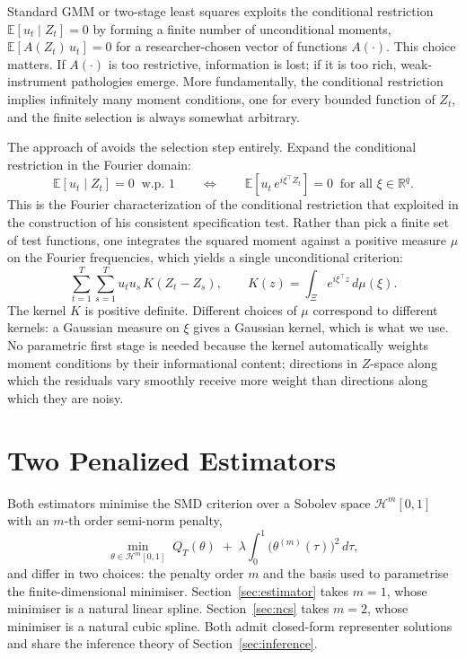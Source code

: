 \documentclass[12pt]{article}
\newcommand{\R}{\mathbb{R}}
\newcommand{\E}{\mathbb{E}}
\newcommand{\calH}{\mathcal{H}}
\begin{document}
Standard GMM or two-stage least squares exploits the conditional restriction $\E[u_t \mid Z_t] = 0$ by forming a finite number of unconditional moments, $\E[A(Z_t)\, u_t] = 0$ for a researcher-chosen vector of functions $A(\cdot)$. This choice matters. If $A(\cdot)$ is too restrictive, information is lost; if it is too rich, weak-instrument pathologies emerge. More fundamentally, the conditional restriction implies infinitely many moment conditions, one for every bounded function of $Z_t$, and the finite selection is always somewhat arbitrary.

The approach of \citet{AntoineSun2024} avoids the selection step entirely. Expand the conditional restriction in the Fourier domain:
\[
  \E[u_t \mid Z_t] = 0 \;\; \text{w.p.\ 1}
  \qquad\Longleftrightarrow\qquad
  \E\!\left[u_t\, e^{i \xi^\top Z_t}\right] = 0 \;\; \text{for all } \xi \in \R^q.
\]
This is the Fourier characterization of the conditional restriction that \citet{Bierens1982} exploited in the construction of his consistent specification test. Rather than pick a finite set of test functions, one integrates the squared moment against a positive measure $\mu$ on the Fourier frequencies, which yields a single unconditional criterion:
\[
  \sum_{t=1}^T \sum_{s=1}^T u_t u_s \, K(Z_t - Z_s),
  \qquad
  K(z) = \int_\Xi e^{i \xi^\top z} \, d\mu(\xi).
\]
The kernel $K$ is positive definite. Different choices of $\mu$ correspond to different kernels: a Gaussian measure on $\xi$ gives a Gaussian kernel, which is what we use. No parametric first stage is needed because the kernel automatically weights moment conditions by their informational content; directions in $Z$-space along which the residuals vary smoothly receive more weight than directions along which they are noisy.


\section{Two Penalized Estimators}\label{sec:estimators}

Both estimators minimise the SMD criterion over a Sobolev space $\calH^m[0,1]$ with an $m$-th order semi-norm penalty,
\begin{equation}\label{eq:general-penalized}
  \min_{\theta \in \calH^m[0,1]}\; Q_T(\theta) \;+\; \lambda \int_0^1 \bigl(\theta^{(m)}(\tau)\bigr)^2\, d\tau,
\end{equation}
and differ in two choices: the penalty order $m$ and the basis used to parametrise the finite-dimensional minimiser. Section~\ref{sec:estimator} takes $m = 1$, whose minimiser is a natural linear spline. Section~\ref{sec:ncs} takes $m = 2$, whose minimiser is a natural cubic spline. Both admit closed-form representer solutions and share the inference theory of Section~\ref{sec:inference}.
\end{document}
